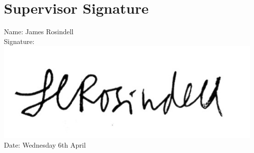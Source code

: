 \documentclass[11pt,titlepage]{article}
\begin{document}
	\section{Supervisor Signature}
	
	Name: James Rosindell \\
	Signature: \\
	\includegraphics[scale = 0.4]{james_signature.jpg}\\
	Date: Wednesday 6th April\\
	
	
\end{document}
